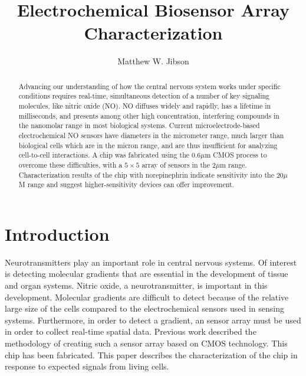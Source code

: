 \documentclass{report}
\begin{document}
\title{Electrochemical Biosensor Array Characterization}
\author{Matthew W. Jibson}

\maketitle{}

\setcounter{page}{2}

\begin{abstract}

Advancing our understanding of how the central nervous system works under specific conditions requires real-time, simultaneous detection of a number of key signaling molecules, like nitric oxide (NO). NO diffuses widely and rapidly, has a lifetime in milliseconds, and presents among other high concentration, interfering compounds in the nanomolar range in most biological systems. Current microelectrode-based electrochemical NO sensors have diameters in the micrometer range, much larger than biological cells which are in the micron range, and are thus insufficient for analyzing cell-to-cell interactions. A chip was fabricated using the 0.6$\mu$m CMOS process to overcome these difficulties, with a $5 \times 5$ array of sensors in the 2$\mu$m range. Characterization results of the chip with norepinephrin indicate sensitivity into the 20$\mu$M range and suggest higher-sensitivity devices can offer improvement.

\end{abstract}

\tableofcontents\newpage
\listoffigures\newpage

\setcounter{page}{1}

\chapter{Introduction}

Neurotransmitters play an important role in central nervous systems. Of interest is detecting molecular gradients that are essential in the development of tissue and organ systems. Nitric oxide, a neurotransmitter, is important in this development. Molecular gradients are difficult to detect because of the relative large size of the cells compared to the electrochemical sensors used in sensing systems. Furthermore, in order to detect a gradient, an sensor array must be used in order to collect real-time spatial data. Previous work described the methodology of creating such a sensor array based on CMOS technology. This chip has been fabricated. This paper describes the characterization of the chip in response to expected signals from living cells.
\end{document}
